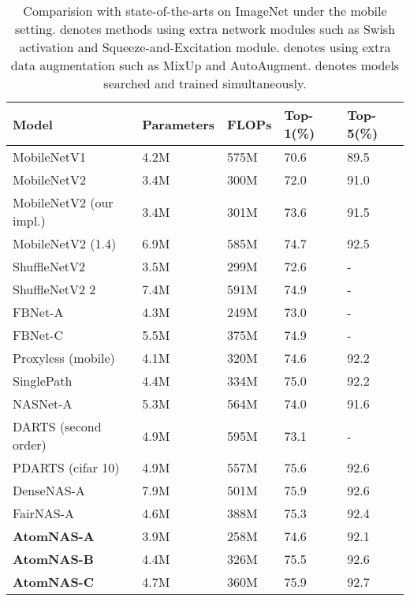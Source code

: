\documentclass{article} \usepackage{iclr2020_conference,times}
\newcommand{\flops}{FLOPs\xspace}
\begin{document}
\begin{table}[t]
\caption{Comparision with state-of-the-arts on ImageNet under the mobile setting.  denotes methods using extra network modules such as Swish activation and Squeeze-and-Excitation module.  denotes using extra data augmentation such as MixUp and AutoAugment.  denotes models searched and trained simultaneously.}
\label{sample-table}
\begin{center}
\begin{tabular}{lllll}
\toprule
Model & Parameters & \flops & Top-1(\%) & Top-5(\%) \\
\midrule
MobileNetV1 \citep{howard2017mobilenet}           & 4.2M & 575M & 70.6 & 89.5 \\
MobileNetV2 \citep{sandler2018mobilenetv2}        & 3.4M & 300M & 72.0 & 91.0 \\
MobileNetV2 (our impl.)                           & 3.4M & 301M & 73.6 & 91.5 \\
MobileNetV2 (1.4) & 6.9M & 585M & 74.7 & 92.5 \\
ShuffleNetV2 \citep{ma2018shufflenet_v2}          & 3.5M & 299M & 72.6 & - \\
ShuffleNetV2 2      & 7.4M & 591M & 74.9 & - \\
\midrule
FBNet-A \citep{wu2019fbnet}         & 4.3M & 249M & 73.0 & - \\
FBNet-C         & 5.5M & 375M & 74.9 & - \\
Proxyless (mobile) \citep{han2019proxyless}                  & 4.1M & 320M & 74.6 & 92.2 \\
SinglePath \citep{stamoulis2019single_path} & 4.4M & 334M & 75.0 & 92.2 \\
NASNet-A \citep{zoph2017nasnet}     & 5.3M & 564M & 74.0 & 91.6 \\
DARTS (second order) \citep{hanxiao2019darts}      & 4.9M & 595M & 73.1 & - \\
PDARTS (cifar 10) \citep{chen2019pdarts}       & 4.9M & 557M & 75.6 & 92.6 \\
DenseNAS-A \citep{fang2019densenas} & 7.9M & 501M & 75.9 & 92.6 \\
FairNAS-A \citep{chu2019fairnas} & 4.6M & 388M & 75.3 & 92.4 \\

\textbf{AtomNAS-A}  & 3.9M & 258M & 74.6 & 92.1 \\
\textbf{AtomNAS-B}  & 4.4M & 326M & 75.5 & 92.6 \\
\textbf{AtomNAS-C}  & 4.7M & 360M & 75.9 & 92.7 \\


\end{tabular}
\end{center}
\end{table}
\end{document}
